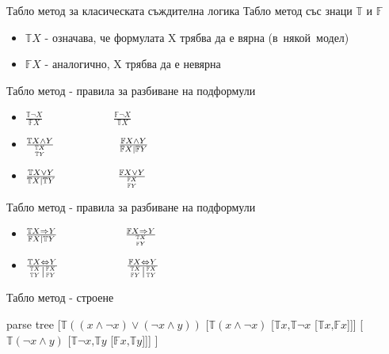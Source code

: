 \documentclass[14pt, aspectratio=169]{beamer}
\newcommand\ST{\mathbb{T}}
\newcommand\SF{\mathbb{F}}
\begin{document}

\begin{frame}{Табло метод за класическата съждителна логика}
	Табло метод със знаци $\ST$ и $\SF$
	\begin{itemize}
		\item $\ST X$ - означава, че формулата X трябва да е вярна (в~някой~модел)
		\item $\SF X$ - аналогично, X трябва да е невярна
	\end{itemize}
\end{frame}

\begin{frame}{Табло метод - правила за разбиване на подформули}
	\begin{itemize}
	\LARGE
		\item<1-> $\frac{\ST \neg X}{\SF X}\;\;\;\;\;\;\;\;\;\;\;\;\;\;\;\;\;\;\;\;\;\;\ \frac{\SF \neg X}{\ST X}$
		\\ [8mm]
		\item<2-> $\frac{\ST X \land Y}{{\ST X \atop \ST Y}} \;\;\;\;\;\;\;\;\;\;\;\;\;\;\;\;\;\;\;\;\; \frac{\SF X \land Y}{\SF X \mid \SF Y}$
		\\ [8mm]
		\item<3-> $\frac{\ST X \lor Y}{\ST X \mid \ST Y} \;\;\;\;\;\;\;\;\;\;\;\;\;\;\;\;\;\;\;\ \frac{\SF X \lor Y}{{\SF X \atop \SF Y}}$
	\normalsize
	\end{itemize}
\end{frame}

\begin{frame}{Табло метод - правила за разбиване на подформули}
	\begin{itemize}
	\LARGE
		\item $\frac{\ST X \Rightarrow Y}{\SF X \mid \ST Y} \;\;\;\;\;\;\;\;\;\;\;\;\;\;\;\;\;\;\;\;\;\ \frac{\SF X \Rightarrow Y}{{\ST X \atop \SF Y}}$
		\\ [8mm]
		\item $\frac{\ST X \Leftrightarrow Y}{\left.{\ST X \atop \ST Y}\right\vert{\SF X \atop \SF Y}} \;\;\;\;\;\;\;\;\;\;\;\;\;\;\;\;\;\;\;\;\;\ \frac{\SF X \Leftrightarrow Y}{\left.{\ST X \atop \SF Y}\right\vert{\SF X \atop \ST Y}}$
	\normalsize
	\end{itemize}
\end{frame}

\begin{frame}{Табло метод - строене}
	\begin{center}
	\begin{forest}
		parse tree
		[$\ST ((x \land \neg x) \lor (\neg x \land y))$
			[$\ST (x \land \neg x)$ [$\ST x \mbox{,} \ST \neg x$ [$\ST x \mbox{,} \SF x$]]]
			[$\ST (\neg x \land y)$ [$\ST \neg  x \mbox{,} \ST y$ [$\SF x \mbox{,} \ST y$]]]
		]
	\end{forest}
	\end{center}
\end{frame}
\end{document}

